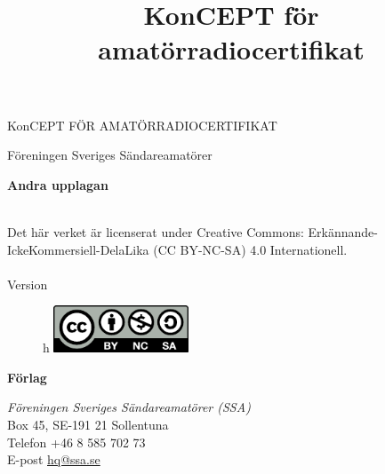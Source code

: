 \vspace{10em}
\title{KonCEPT för amatörradiocertifikat}
\begin{center}
\Large{KonCEPT FÖR AMATÖRRADIOCERTIFIKAT}

Föreningen Sveriges Sändareamatörer\\[2\baselineskip]
\end{center}


\noindent \textbf{Andra upplagan}

\noindent
\\
\noindent Det här verket är licenserat under Creative Commons:\newline
\noindent Erkännande-IckeKommersiell-DelaLika (CC BY-NC-SA) 4.0 Internationell.
\\
\\
\noindent Version \revision

\begin{figure}{h}
    \includegraphics[width=4cm]{images/cc-by-nc-sa}
\end{figure}


\vfill

\noindent
\textbf{Förlag}

\noindent
\textit{Föreningen Sveriges Sändareamatörer (SSA)}\\
Box 45, SE-191 21 Sollentuna\\
Telefon +46 8 585 702 73\\
E-post \href{mailto:hq@ssa.se}{hq@ssa.se}\\[\baselineskip]

